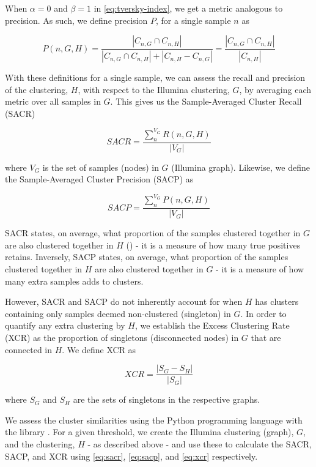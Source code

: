 When $\alpha = 0$ and $\beta = 1$ in \autoref{eq:tversky-index}, we get a metric analogous to precision. As such, we define precision $P$, for a single sample $n$ as

\begin{equation}
\label{eq:precision}
   P(n, G, H)=\frac{\left|C_{n,G}\cap C_{n,H}\right|}{\left|C_{n,G}\cap C_{n,H}\right|+|C_{n,H}-C_{n,G}|}=\frac{\left|C_{n,G}\cap C_{n,H}\right|}{|C_{n,H}|}
\end{equation}

With these definitions for a single sample, we can assess the recall and precision of the \ont{} clustering, $H$, with respect to the Illumina clustering, $G$, by averaging each metric over all samples in $G$. This gives us the Sample-Averaged Cluster Recall (SACR)

\begin{equation}
\label{eq:sacr}
   SACR=\frac{\sum_{n}^{V_G}R(n, G, H)}{|V_G|}
\end{equation}

where $V_G$ is the set of samples (nodes) in $G$ (Illumina graph). Likewise, we define the Sample-Averaged Cluster Precision (SACP) as 

\begin{equation}
\label{eq:sacp}
   SACP=\frac{\sum_{n}^{V_G}P(n, G, H)}{|V_G|}
\end{equation}

SACR states, on average, what proportion of the samples clustered together in $G$ are also clustered together in $H$ (\ont{}) - it is a measure of how many true positives \ont{} retains. Inversely, SACP states, on average, what proportion of the samples clustered together in $H$ are also clustered together in $G$ - it is a measure of how many extra samples \ont{} adds to clusters. 

However, SACR and SACP do not inherently account for when $H$ has clusters containing only samples deemed non-clustered (singleton) in $G$. In order to quantify any extra clustering by $H$, we establish the Excess Clustering Rate (XCR) as the proportion of singletons (disconnected nodes) in $G$ that are connected in $H$. We define XCR as

\begin{equation}
\label{eq:xcr}
    XCR = \frac{|S_G-S_H|}{|S_G|}
\end{equation}

where $S_G$ and $S_H$ are the sets of singletons in the respective graphs. 

\noindent
We assess the cluster similarities using the Python programming language with the  library \cite{networkx}. For a given threshold, we create the Illumina clustering (graph), $G$, and the \ont{} clustering, $H$ - as described above - and use these to calculate the SACR, SACP, and XCR using \autoref{eq:sacr}, \autoref{eq:sacp}, and \autoref{eq:xcr} respectively.


